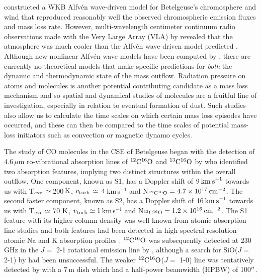 \documentclass[iop]{emulateapj}
\begin{document}
\cite{1984ApJ...284..238H} constructed a WKB Alfv\'{e}n wave-driven model for Betelgeuse's chromosphere and wind that reproduced reasonably well the observed chromospheric emission fluxes and mass loss rate. However, multi-wavelength centimeter continuum radio observations made with the Very Large Array (VLA) by \cite{1998Natur.392..575L} revealed that the atmosphere was much cooler than the Alfv\'{e}n wave-driven model predicted \citep{harper_2001}. Although  new nonlinear Alfv\'{e}n wave models have been computed by \cite{2000ApJ...528..965A}, there are currently no theoretical models that make specific predictions for {\em both} the dynamic and thermodynamic state of the mass outflow. Radiation pressure on atoms and molecules is another potential contributing candidate as a mass loss mechanism and so spatial and dynamical studies of molecules are a fruitful line of investigation, especially in relation to eventual formation of dust. Such studies also allow us to calculate the time scales on which certain mass loss episodes have occurred, and these can then be compared to the time scales of potential mass-loss initiators such as convection or magnetic dynamo cycles.

The study of CO molecules in the CSE of Betelgeuse began with the detection of 4.6\,$\mu$m ro-vibrational absorption lines of $\rm{{}^{12}C^{16}O}$ and $\rm{{}^{13}C^{16}O}$ by \cite{1979ApJ...233L.135B} who identified two absorption features, implying two distinct structures within the overall outflow. One component, known as S1, has a Doppler shift of $9\>{\rm km\>s}^{-1}$ towards us with T$_{\rm{exc}}\,\simeq$\,200\,$\rm{K}$, $v_{\rm{turb}}\,\simeq\,4$\,km\,s${}^{-1}$ and N$_{\rm{^{12}C^{16}O}}=4.7\times 10^{17}\>{\rm cm}^{-2}$. The second faster component, known as S2, has a Doppler shift of $16\>{\rm km\>s}^{-1}$ towards us with T$_{\rm{exc}} \simeq$ 70 $\rm{K}$, $v_{\rm{turb}}\simeq 1$\,km\,s${}^{-1}$ and N$_{\rm{^{12}C^{16}O}}=1.2\times 10^{16}\>{\rm cm}^{-2}$. The S1 feature with its higher column density was well known from atomic absorption line studies \citep[e.g.][]{1962ApJ...136..844W} and both features had been detected in high spectral resolution atomic Na and K absorption profiles \citep{1975ApJ...199..427G}. $\rm{{}^{12}C^{16}O}$ was subsequently detected at 230\,GHz in the $J=$ 2-1 rotational emission line by \cite{1980ApJ...242L..25K}, although a search for SiO($J=$ 2-1) by \cite{1978ApJ...221..854L} had been unsuccessful. The weaker $\rm{{}^{12}C^{16}O}$($J=$ 1-0) line was tentatively detected by \cite{1985ApJ...292..640K} with a 7\,m dish which had a half-power beamwidth (HPBW) of 100$\mbox{$^{\prime\prime}$}$.
\end{document}
